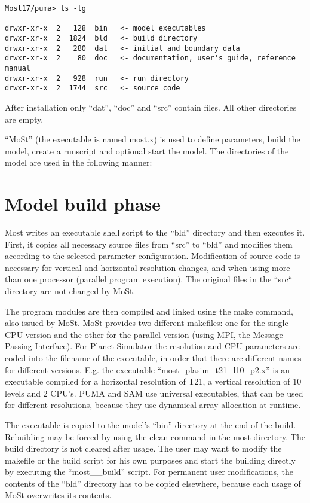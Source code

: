 \begin{verbatim}
Most17/puma> ls -lg

drwxr-xr-x  2   128  bin   <- model executables
drwxr-xr-x  2  1824  bld   <- build directory
drwxr-xr-x  2   280  dat   <- initial and boundary data
drwxr-xr-x  2    80  doc   <- documentation, user's guide, reference manual
drwxr-xr-x  2   928  run   <- run directory
drwxr-xr-x  2  1744  src   <- source code
\end{verbatim}

After installation only ``dat'', ``doc'' and ``src'' contain files.
All other directories are empty.

``MoSt'' (the executable is named most.x) is used to define parameters,
build the model, create a runscript and optional start the model.
The directories of the model are used in the following manner:

\section{Model build phase}

Most writes an executable shell script to the ``bld'' directory
and then executes it.
First, it copies all necessary source files from ``src'' to ``bld''
and modifies them according to the selected parameter configuration.
Modification of source code is necessary for vertical and horizontal
resolution changes, and when using more than one processor (parallel program
execution). The original files in the ``src`` directory are not changed by MoSt.

The program modules are then compiled and linked using the make command,
also issued by MoSt. MoSt provides two different makefiles:
one for the single CPU version and the other for the parallel version
(using MPI, the Message Passing Interface).
For Planet Simulator the resolution and CPU parameters are coded into the filename of the
executable, in order that there are different names for different versions.
E.g. the executable ``most\_plasim\_t21\_l10\_p2.x''
is an executable compiled for a horizontal resolution of T21,
a vertical resolution of 10 levels and 2 CPU's.
PUMA and SAM use universal executables, that can be used for different
resolutions, because they use dynamical array allocation at runtime.

The executable is copied to the model's ``bin'' directory
at the end of the build.
Rebuilding may be forced by using the {clean\modir} command
in the most directory.
The build directory is not cleared after usage. The user may want
to modify the makefile or the build script for his own purposes
and start the building directly by executing the ``most\_\modir\_build''
script.
For permanent user modifications,
the contents of the ``bld'' directory has to be copied elsewhere,
because each usage of MoSt overwrites its contents.

